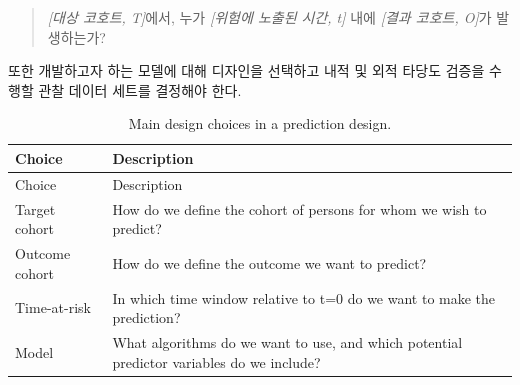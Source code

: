\documentclass[10.5pt]{book}
\theoremstyle{definition}
\theoremstyle{definition}
\theoremstyle{definition}
\theoremstyle{remark}
\begin{document}
\begin{quote}
\emph{{[}대상 코호트, T{]}}에서, 누가 \emph{{[}위험에 노출된 시간, t{]}}
내에 \emph{{[}결과 코호트, O{]}}가 발생하는가?
\end{quote}

또한 개발하고자 하는 모델에 대해 디자인을 선택하고 내적 및 외적 타당도
검증을 수행할 관찰 데이터 세트를 결정해야 한다.

\begin{longtable}[]{@{}ll@{}}
\caption{\label{tab:plpDesign} Main design choices in a prediction
design.}\tabularnewline
\toprule
\begin{minipage}[b]{0.23\columnwidth}\raggedright\strut
Choice\strut
\end{minipage} & \begin{minipage}[b]{0.71\columnwidth}\raggedright\strut
Description\strut
\end{minipage}\tabularnewline
\midrule
\endfirsthead
\toprule
\begin{minipage}[b]{0.23\columnwidth}\raggedright\strut
Choice\strut
\end{minipage} & \begin{minipage}[b]{0.71\columnwidth}\raggedright\strut
Description\strut
\end{minipage}\tabularnewline
\midrule
\endhead
\begin{minipage}[t]{0.23\columnwidth}\raggedright\strut
Target cohort\strut
\end{minipage} & \begin{minipage}[t]{0.71\columnwidth}\raggedright\strut
How do we define the cohort of persons for whom we wish to
predict?\strut
\end{minipage}\tabularnewline
\begin{minipage}[t]{0.23\columnwidth}\raggedright\strut
Outcome cohort\strut
\end{minipage} & \begin{minipage}[t]{0.71\columnwidth}\raggedright\strut
How do we define the outcome we want to predict?\strut
\end{minipage}\tabularnewline
\begin{minipage}[t]{0.23\columnwidth}\raggedright\strut
Time-at-risk\strut
\end{minipage} & \begin{minipage}[t]{0.71\columnwidth}\raggedright\strut
In which time window relative to t=0 do we want to make the
prediction?\strut
\end{minipage}\tabularnewline
\begin{minipage}[t]{0.23\columnwidth}\raggedright\strut
Model\strut
\end{minipage} & \begin{minipage}[t]{0.71\columnwidth}\raggedright\strut
What algorithms do we want to use, and which potential predictor
variables do we include?\strut
\end{minipage}\tabularnewline
\bottomrule
\end{longtable}
\end{document}
